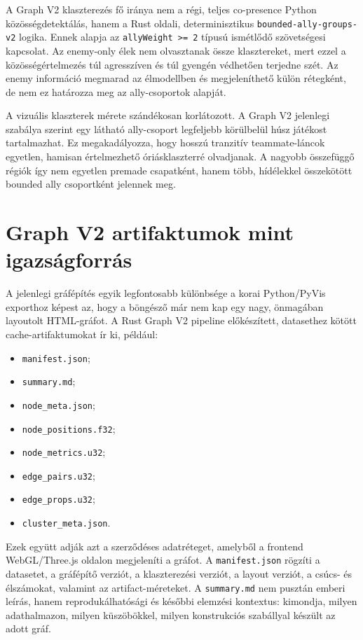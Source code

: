 ﻿\documentclass[a4paper,12pt]{report}
\begin{document}
A Graph V2 klaszterezés fő iránya nem a régi, teljes co-presence Python közösségdetektálás, hanem a Rust oldali, determinisztikus \texttt{bounded-ally-groups-v2} logika. Ennek alapja az \texttt{allyWeight >= 2} típusú ismétlődő szövetségesi kapcsolat. Az enemy-only élek nem olvasztanak össze klasztereket, mert ezzel a közösségértelmezés túl agresszíven és túl gyengén védhetően terjedne szét. Az enemy információ megmarad az élmodellben és megjeleníthető külön rétegként, de nem ez határozza meg az ally-csoportok alapját.

A vizuális klaszterek mérete szándékosan korlátozott. A Graph V2 jelenlegi szabálya szerint egy látható ally-csoport legfeljebb körülbelül húsz játékost tartalmazhat. Ez megakadályozza, hogy hosszú tranzitív teammate-láncok egyetlen, hamisan értelmezhető óriásklaszterré olvadjanak. A nagyobb összefüggő régiók így nem egyetlen premade csapatként, hanem több, hídélekkel összekötött bounded ally csoportként jelennek meg.

\section{Graph V2 artifaktumok mint igazságforrás}

A jelenlegi gráfépítés egyik legfontosabb különbsége a korai Python/PyVis exporthoz képest az, hogy a böngésző már nem kap egy nagy, önmagában layoutolt HTML-gráfot. A Rust Graph V2 pipeline előkészített, datasethez kötött cache-artifaktumokat ír ki, például:

\begin{itemize}
    \item \texttt{manifest.json};
    \item \texttt{summary.md};
    \item \texttt{node\_meta.json};
    \item \texttt{node\_positions.f32};
    \item \texttt{node\_metrics.u32};
    \item \texttt{edge\_pairs.u32};
    \item \texttt{edge\_props.u32};
    \item \texttt{cluster\_meta.json}.
\end{itemize}

Ezek együtt adják azt a szerződéses adatréteget, amelyből a frontend WebGL/Three.js oldalon megjeleníti a gráfot. A \texttt{manifest.json} rögzíti a datasetet, a gráfépítő verziót, a klaszterezési verziót, a layout verziót, a csúcs- és élszámokat, valamint az artifact-méreteket. A \texttt{summary.md} nem pusztán emberi leírás, hanem reprodukálhatósági és későbbi elemzési kontextus: kimondja, milyen adathalmazon, milyen küszöbökkel, milyen konstrukciós szabállyal készült az adott gráf.
\end{document}
